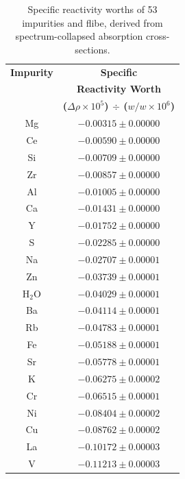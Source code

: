 \documentclass[11pt]{article}
\newcommand{\E}[1]{\times10^{#1}}
\newcommand{\water}[0]{$\mathrm{H_2O}$}
\begin{document}
\clearpage
\begin{table}[ht]\footnotesize
    \centering
    \caption{Specific reactivity worths of 53 impurities and flibe, derived from spectrum-collapsed absorption cross-sections.}
    \label{tab:absorptionWorths}
    \begin{tabular}{| c | c |} \hline
    \textbf{Impurity} & \textbf{Specific} \\
                      & \textbf{Reactivity Worth} \\
                      & \textbf{($\Delta\rho \E{5}$) $\div$ ($w/w \E{6}$)} \\ \hline
    Mg                &   $-0.00315\pm0.00000$ \\ \hline
    Ce                &   $-0.00590\pm0.00000$ \\ \hline
    Si                &   $-0.00709\pm0.00000$ \\ \hline
    Zr                &   $-0.00857\pm0.00000$ \\ \hline
    Al                &   $-0.01005\pm0.00000$ \\ \hline
    Ca                &   $-0.01431\pm0.00000$ \\ \hline
    Y                 &   $-0.01752\pm0.00000$ \\ \hline
    S                 &   $-0.02285\pm0.00000$ \\ \hline
    Na                &   $-0.02707\pm0.00001$ \\ \hline
    Zn                &   $-0.03739\pm0.00001$ \\ \hline
    \water{}          &   $-0.04029\pm0.00001$ \\ \hline
    Ba                &   $-0.04114\pm0.00001$ \\ \hline
    Rb                &   $-0.04783\pm0.00001$ \\ \hline
    Fe                &   $-0.05188\pm0.00001$ \\ \hline
    Sr                &   $-0.05778\pm0.00001$ \\ \hline
    K                 &   $-0.06275\pm0.00002$ \\ \hline
    Cr                &   $-0.06515\pm0.00001$ \\ \hline
    Ni                &   $-0.08404\pm0.00002$ \\ \hline
    Cu                &   $-0.08762\pm0.00002$ \\ \hline
    La                &   $-0.10172\pm0.00003$ \\ \hline
    V                 &   $-0.11213\pm0.00003$ \\ \hline

\end{tabular}
\end{table}
\end{document}
